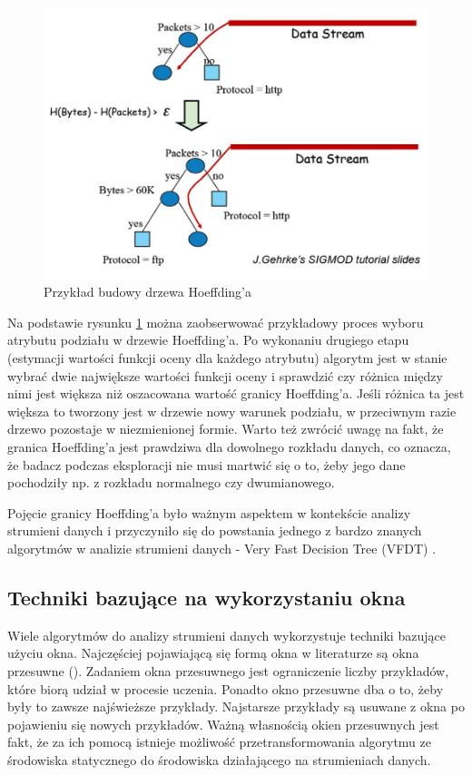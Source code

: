 \begin{figure}[h] 
    \centering
    \includegraphics[width=15cm]{figures/hoeffding_tree.JPG}
    \caption{Przykład budowy drzewa Hoeffding'a \cite{Prezentacja:Strumienie}}\label{Figure:HoeffdingTree}
\end{figure}

\noindent Na podstawie rysunku \ref{Figure:HoeffdingTree} można zaobserwować przykładowy proces wyboru atrybutu podziału w drzewie Hoeffding'a. Po wykonaniu drugiego etapu (estymacji wartości funkcji oceny dla każdego atrybutu) algorytm jest w stanie wybrać dwie największe wartości funkcji oceny i sprawdzić czy różnica między nimi jest większa niż oszacowana wartość granicy Hoeffding'a. Jeśli różnica ta jest większa to tworzony jest w drzewie nowy warunek podziału, w przeciwnym razie drzewo pozostaje w niezmienionej formie. Warto też zwrócić uwagę na fakt, że granica Hoeffding'a jest prawdziwa dla dowolnego rozkładu danych, co oznacza, że badacz podczas eksploracji nie musi martwić się o to, żeby jego dane pochodziły np. z rozkładu normalnego czy dwumianowego.

Pojęcie granicy Hoeffding'a było ważnym aspektem w kontekście analizy strumieni danych i przyczyniło się do powstania jednego z bardzo znanych algorytmów w analizie strumieni danych - Very Fast Decision Tree (VFDT) \cite{Article:VFDT}.

\subsection{Techniki bazujące na wykorzystaniu okna}

\noindent Wiele algorytmów do analizy strumieni danych wykorzystuje techniki bazujące użyciu okna. Najczęściej pojawiającą się formą okna w literaturze są okna przesuwne (). Zadaniem okna przesuwnego jest ograniczenie liczby przykładów, które biorą udział w procesie uczenia. Ponadto okno przesuwne dba o to, żeby były to zawsze najświeższe przykłady. Najstarsze przykłady są usuwane z okna po pojawieniu się nowych przykładów. Ważną własnością okien przesuwnych jest fakt, że za ich pomocą istnieje możliwość przetransformowania algorytmu ze środowiska statycznego do środowiska działającego na strumieniach danych.

